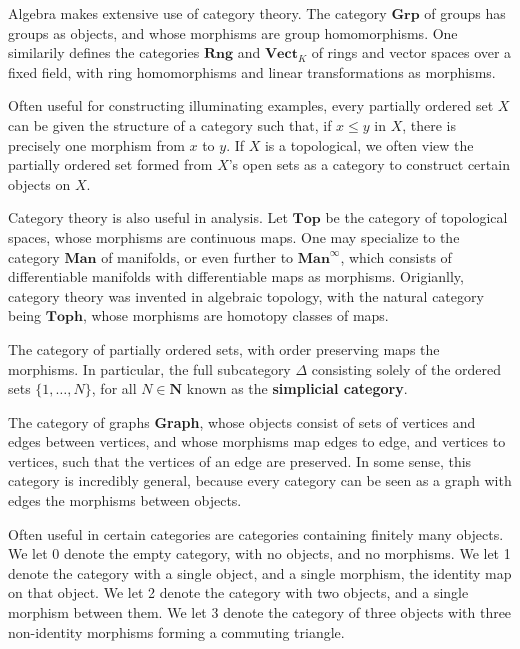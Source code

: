 \begin{example}
    Algebra makes extensive use of category theory. The category $\mathbf{Grp}$ of groups has groups as objects, and whose morphisms are group homomorphisms. One similarily defines the categories $\mathbf{Rng}$ and $\mathbf{Vect}_K$ of rings and vector spaces over a fixed field, with ring homomorphisms and linear transformations as morphisms.
\end{example}

\begin{example}
    Often useful for constructing illuminating examples, every partially ordered set $X$ can be given the structure of a category such that, if $x \leq y$ in $X$, there is precisely one morphism from $x$ to $y$. If $X$ is a topological, we often view the partially ordered set formed from $X$'s open sets as a category to construct certain objects on $X$.
\end{example}

\begin{example}
    Category theory is also useful in analysis. Let $\mathbf{Top}$ be the category of topological spaces, whose morphisms are continuous maps. One may specialize to the category $\mathbf{Man}$ of manifolds, or even further to $\mathbf{Man}^\infty$, which consists of differentiable manifolds with differentiable maps as morphisms. Origianlly, category theory was invented in algebraic topology, with the natural category being $\mathbf{Toph}$, whose morphisms are homotopy classes of maps.
\end{example}

\begin{example}
    The category of partially ordered sets, with order preserving maps the morphisms. In particular, the full subcategory $\Delta$ consisting solely of the ordered sets $\{ 1, \dots, N \}$, for all $N \in \mathbf{N}$ known as the {\bf simplicial category}.
\end{example}

\begin{example}
    The category of graphs {\bf Graph}, whose objects consist of sets of vertices and edges between vertices, and whose morphisms map edges to edge, and vertices to vertices, such that the vertices of an edge are preserved. In some sense, this category is incredibly general, because every category can be seen as a graph with edges the morphisms between objects.
\end{example}

\begin{example}
    Often useful in certain categories are categories containing finitely many objects. We let 0 denote the empty category, with no objects, and no morphisms. We let 1 denote the category with a single object, and a single morphism, the identity map on that object. We let 2 denote the category with two objects, and a single morphism between them. We let 3 denote the category of three objects with three non-identity morphisms forming a commuting triangle.
\end{example}

